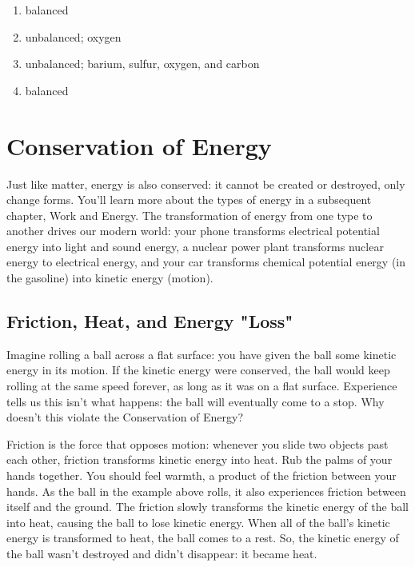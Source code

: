 \begin{Answer}[ref = balance]
\begin{enumerate}
\item balanced
\item unbalanced; oxygen
\item unbalanced; barium, sulfur, oxygen, and carbon
\item balanced
\end{enumerate}
\end{Answer}

\section{Conservation of Energy}
Just like matter, energy is also conserved: it cannot be created or destroyed, 
only change forms. You'll learn more about the types of energy in a subsequent 
chapter, Work and Energy. The transformation of energy from one type to another 
drives our modern world: your phone transforms electrical potential energy into 
light and sound energy, a nuclear power plant transforms nuclear energy to 
electrical energy, and your car transforms chemical potential energy (in the 
gasoline) into kinetic energy (motion).

\subsection{Friction, Heat, and Energy "Loss"}
Imagine rolling a ball across a flat surface: you have given the ball some 
kinetic energy in its motion. If the kinetic energy were conserved, the ball 
would keep rolling at the same speed forever, as long as it was on a flat 
surface. Experience tells us this isn't what happens: the ball will eventually 
come to a stop. Why doesn't this violate the Conservation of Energy?

Friction is the force that opposes motion: whenever you slide two objects past 
each other, friction transforms kinetic energy into heat. Rub the palms of your 
hands together. You should feel warmth, a product of the friction between your 
hands. As the ball in the example above rolls, it also experiences friction 
between itself and the ground. The friction slowly transforms the kinetic energy 
of the ball into heat, causing the ball to lose kinetic energy. When all of the 
ball's kinetic energy is transformed to heat, the ball comes to a rest. So, the 
kinetic energy of the ball wasn't destroyed and didn't disappear: it became heat. 

